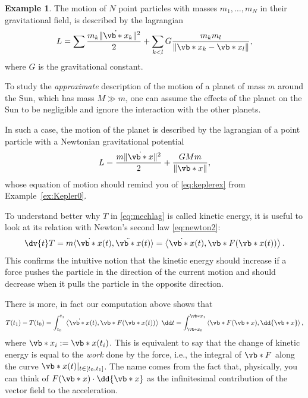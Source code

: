 \documentclass[english,fontsize=11pt,paper=b5]{scrbook}
\numberwithin{equation}{chapter}
\theoremstyle{definition}
\newtheorem{example}{Example}[chapter]
\begin{document}
    \begin{example}\label{ex:kepler1}
      The motion of $N$ point particles with masses $m_1, \ldots, m_N$ in their gravitational field, is described by the lagrangian
      \begin{equation}
        L = \sum\frac{m_k \|\dot{\vb*{x}}_k\|^2}{2} + \sum_{k < l} G \frac{m_k m_l}{\|\vb*{x}_k - \vb*{x}_l\|},
      \end{equation}
      where $G$ is the gravitational constant.

      To study the \emph{approximate} description of the motion of a planet of mass $m$ around the Sun, which has mass $M \gg m$, one can assume the effects of the planet on the Sun to be negligible and ignore the interaction with the other planets.

      In such a case, the motion of the planet is described by the lagrangian of a point particle with a Newtonian gravitational potential
      \begin{equation}
        L = \frac{m\|\dot{\vb*{x}}\|^2}{2} + \frac{G M m}{\|\vb*{x}\|},
      \end{equation}
      whose equation of motion should remind you of \eqref{eq:keplerex} from Example~\ref{ex:Kepler0}.
    \end{example}

    To understand better why $T$ in \eqref{eq:mechlag} is called kinetic energy, it is useful to look at its relation with Newton's second law \eqref{eq:newton2}:
    \begin{equation}
      \dv{t} T
      = m \langle\dot{\vb*{x}}(t), \ddot{\vb*{x}}(t)\rangle
      = \left\langle\dot{\vb*{x}}(t), \vb*{F}(\vb*{x}(t))\right\rangle.
    \end{equation}
    This confirms the intuitive notion that the kinetic energy should increase if a force pushes the particle in the direction of the current motion and should decrease when it pulls the particle in the opposite direction.

    There is more, in fact our computation above shows that
    \begin{equation}
      T(t_1) - T(t_0) = \int_{t_0}^{t_1} \left\langle\dot{\vb*{x}}(t), \vb*{F}(\vb*{x}(t))\right\rangle\; \dd t = \int_{\vb*{x}_0}^{\vb*{x}_1} \left\langle\vb*{F}(\vb*{x}), \dd{\vb*{x}}\right\rangle,
    \end{equation}
    where $\vb*{x}_i := \vb*{x}(t_i)$.
    This is equivalent to say that the change of kinetic energy is equal to the \emph{work} done by the force, i.e., the integral of $\vb*{F}$ along the curve $\vb*{x}(t)|_{t\in[t_0, t_1]}$. The name comes from the fact that, physically, you can think of $F(\vb*{x}) \cdot \dd{\vb*{x}}$ as the infinitesimal contribution of the vector field to the acceleration.
\end{document}
